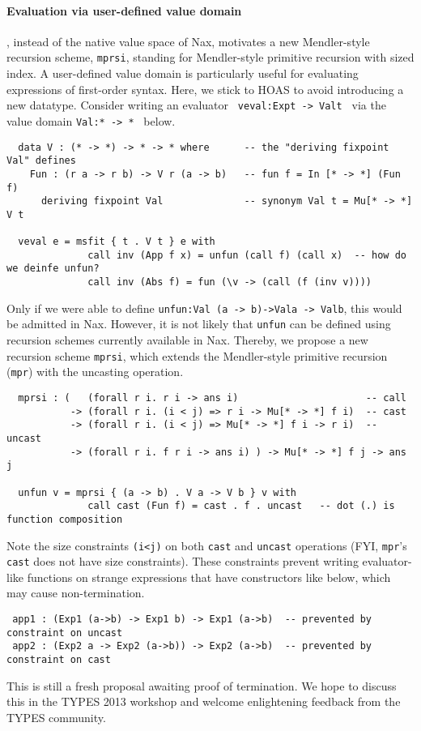\documentclass[a4paper]{easychair} %
\newcommand{\mprsi}[0]{\texttt{mprsi}}
\begin{document}
\paragraph{Evaluation via user-defined value domain\!\!\!\!\!}, instead of
the native value space of Nax, motivates a new Mendler-style recursion scheme,
\mprsi, standing for Mendler-style primitive recursion with sized index.
A user-defined value domain is particularly useful for evaluating expressions
of first-order syntax. Here, we stick to HOAS to avoid introducing a new datatype.
Consider writing an evaluator \texttt{\,veval\;:\;Exp\;t\,->\,Val\;t\,}
via the value domain \texttt{Val\;:\;*\,->\,*\,} below.
{\small
\begin{verbatim}
  data V : (* -> *) -> * -> * where      -- the "deriving fixpoint Val" defines
    Fun : (r a -> r b) -> V r (a -> b)   -- fun f = In [* -> *] (Fun f)
      deriving fixpoint Val              -- synonym Val t = Mu[* -> *] V t

  veval e = msfit { t . V t } e with
              call inv (App f x) = unfun (call f) (call x)  -- how do we deinfe unfun?
              call inv (Abs f) = fun (\v -> (call (f (inv v))))
\end{verbatim} }
\noindent
Only if we were able to define
\texttt{unfun\;:\;Val\,(a\,->\,b)\;->\;Val\;a\,->\,Val\;b},
this would be admitted in Nax.
However, it is not likely that \texttt{unfun} can be defined using
recursion schemes currently available in Nax. Thereby, we propose
a new recursion scheme \mprsi, which extends the Mendler-style primitive recursion
(\texttt{mpr}) with the uncasting operation. 
{\small
\begin{verbatim}
  mprsi : (   (forall r i. r i -> ans i)                      -- call
           -> (forall r i. (i < j) => r i -> Mu[* -> *] f i)  -- cast   
           -> (forall r i. (i < j) => Mu[* -> *] f i -> r i)  -- uncast 
           -> (forall r i. f r i -> ans i) ) -> Mu[* -> *] f j -> ans j

  unfun v = mprsi { (a -> b) . V a -> V b } v with
              call cast (Fun f) = cast . f . uncast   -- dot (.) is function composition
\end{verbatim} }
\noindent
Note the size constraints \texttt{(i\;<\;j)} on both \texttt{cast} and \texttt{uncast} operations
(FYI, \texttt{mpr}'s \texttt{cast} does not have size constraints).
These constraints prevent writing evaluator-like functions on strange expressions
that have constructors like below, which may cause non-termination.
{\small
\begin{verbatim}
 app1 : (Exp1 (a->b) -> Exp1 b) -> Exp1 (a->b)  -- prevented by constraint on uncast
 app2 : (Exp2 a -> Exp2 (a->b)) -> Exp2 (a->b)  -- prevented by constraint on cast
\end{verbatim} }
\noindent
This is still a fresh proposal awaiting proof of termination.
We hope to discuss this in the TYPES 2013 workshop and welcome
enlightening feedback from the TYPES community.
\end{document}
